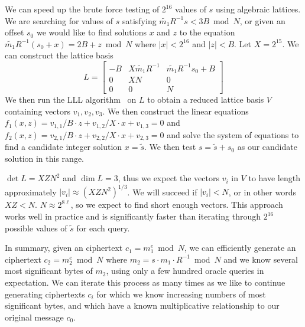 We can speed up the brute force testing of $2^{16}$ values of $s$ using algebraic lattices.  We are searching for values of $s$ satisfying $\tilde{m_1} R^{-1} s < 3 B \bmod N$, or given an offset $s_0$ we would like to find solutions $x$ and $z$ to the equation $\tilde{m_1} R^{-1} (s_0 + x) = 2 B + z \bmod N$ where $|x| < 2^{16}$ and $|z| < B$.  Let $X =  2^{15}$.  We can construct the lattice basis
\[
L = 
\begin{bmatrix}
-B & X\tilde{m_1} R^{-1} & \tilde{m_1} R^{-1} s_0 + B \\
0 & XN & 0 \\
0 & 0 & N
\end{bmatrix}
\]
We then run the LLL algorithm~\cite{lll} on $L$ to obtain a reduced lattice basis $V$ containing vectors $v_1, v_2, v_3$.  We then construct the linear equations $f_1(x,z) = v_{1,1}/B \cdot z +v_{1,2}/X \cdot x + v_{1,3} = 0$ and $f_2(x,z) = v_{2,1}/B \cdot z +v_{2,2}/X \cdot x + v_{2,3} = 0$ and solve the system of equations to find a candidate integer solution $x = \tilde{s}$.  We then test $s = \tilde{s} + s_0$ as our candidate solution in this range.

$\det L = XZN^2$ and $\dim L = 3$, thus we expect the vectors $v_i$ in $V$ to have length approximately $|v_i| \approx (XZN^2)^{1/3}$.  We will succeed if $|v_i| < N$, or in other words $XZ < N$.  $N \approx 2^{8\ell}$, so we expect to find short enough vectors. This approach works well in practice and is significantly faster than iterating through $2^{16}$ possible values of $\tilde{s}$ for each query.

In summary, given an \sslconform ciphertext $c_1 = m_1^e \bmod N$, we can efficiently generate an \sslconform ciphertext $c_2 = m_2^e \bmod N$ where $m_2 = s \cdot m_1 \cdot R^{-1} \bmod N$ and we know several most significant bytes of $m_2$, using only a few hundred oracle queries in expectation.  We can iterate this process as many times as we like to continue generating \sslconform ciphertexts $c_i$ for which we know increasing numbers of most significant bytes, and which have a known multiplicative relationship to our original message $c_0$. 

